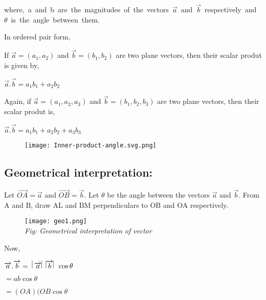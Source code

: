 \documentclass[11pt]{article}
\begin{document}
\mbox{where, a and b are the magnitudes of the vectors  $\overrightarrow{a}$ and $\overrightarrow{b}$ respectively and $\theta$ is the angle between them.}


In ordered pair form,

If $\overrightarrow{a}=(a_1,a_2)$ and $\overrightarrow{b}=(b_1,b_2)$ are two plane vectors, then their scalar produt is given by,


\begin{center}
$\overrightarrow{a}.\overrightarrow{b} = a_1b_1+a_2b_2$
\end{center} 


Again, if $\overrightarrow{a}=(a_1,a_2,a_3)$ and $\overrightarrow{b}=(b_1,b_2,b_3)$ are two plane vectors, then their scalar produt is,


\begin{center}
$\overrightarrow{a}.\overrightarrow{b} = a_1b_1+a_2b_2+a_3b_3$
\end{center} 
\begin{figure}[b]
\texttt{[image: Inner-product-angle.svg.png]}
\centering
\end{figure}
\newpage
\subsection{Geometrical interpretation:}  
Let $\overrightarrow{OA}=\overrightarrow{a}$ and $\overrightarrow{OB}=\overrightarrow{b}$. Let $\theta$ be the angle between the vectors $\overrightarrow{a}$ and $\overrightarrow{b}$. From A and B, draw AL and BM perpendiculars to OB and OA respectively.
\begin{wrapfigure}{r}{0.25\textwidth} %
    \centering
    \texttt{[image: geo1.png]}\\
    \textit{Fig: Geometrical interpretation of vector}
\end{wrapfigure}
Now,



$\overrightarrow{a}.\overrightarrow{b} =\hspace{0.2cm} \vline \overrightarrow{a} \vline \hspace{0.2cm} \vline \overrightarrow{b} \vline \hspace{0.2cm} \cos \theta$


\hspace{0.9cm}
$=ab\cos\theta$


\hspace{0.9cm}
$=(OA)(OB\cos\theta$
\end{document}
